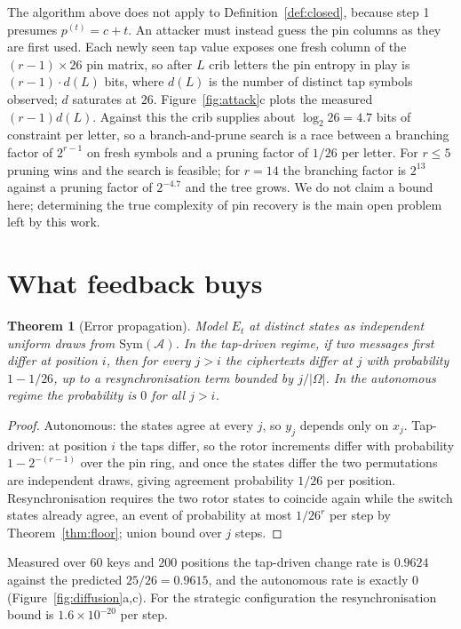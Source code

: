 \documentclass[11pt]{article}
\newtheorem{theorem}{Theorem}
\theoremstyle{definition}
\newcommand{\Sym}{\mathrm{Sym}}
\newcommand{\Om}{\Omega}
\begin{document}
The algorithm above does not apply to Definition~\ref{def:closed}, because step
1 presumes $p^{(t)} = c + t$. An attacker must instead guess the pin columns as
they are first used. Each newly seen tap value exposes one fresh column of the
$(r{-}1)\times 26$ pin matrix, so after $L$ crib letters the pin entropy in play
is $(r-1)\cdot d(L)$ bits, where $d(L)$ is the number of distinct tap symbols
observed; $d$ saturates at $26$. Figure~\ref{fig:attack}c plots the measured
$(r-1)d(L)$. Against this the crib supplies about $\log_2 26 = 4.7$ bits of
constraint per letter, so a branch-and-prune search is a race between a
branching factor of $2^{r-1}$ on fresh symbols and a pruning factor of $1/26$
per letter. For $r \le 5$ pruning wins and the search is feasible; for
$r = 14$ the branching factor is $2^{13}$ against a pruning factor of $2^{-4.7}$
and the tree grows. We do not claim a bound here; determining the true
complexity of pin recovery is the main open problem left by this work.

\section{What feedback buys}\label{sec:feedback}

\begin{theorem}[Error propagation]\label{thm:avalanche}
Model $E_t$ at distinct states as independent uniform draws from
$\Sym(\mathcal{A})$. In the tap-driven regime, if two messages first differ at
position $i$, then for every $j > i$ the ciphertexts differ at $j$ with
probability $1 - 1/26$, up to a resynchronisation term bounded by $j/|\Om|$. In
the autonomous regime the probability is $0$ for all $j > i$.
\end{theorem}

\begin{proof}
Autonomous: the states agree at every $j$, so $y_j$ depends only on $x_j$.
Tap-driven: at position $i$ the taps differ, so the rotor increments differ with
probability $1 - 2^{-(r-1)}$ over the pin ring, and once the states differ the
two permutations are independent draws, giving agreement probability $1/26$ per
position. Resynchronisation requires the two rotor states to coincide again
while the switch states already agree, an event of probability at most
$1/26^{r}$ per step by Theorem~\ref{thm:floor}; union bound over $j$ steps.
\end{proof}

Measured over $60$ keys and $200$ positions the tap-driven change rate is
$0.9624$ against the predicted $25/26 = 0.9615$, and the autonomous rate is
exactly $0$ (Figure~\ref{fig:diffusion}a,c). For the strategic configuration the
resynchronisation bound is $1.6\times10^{-20}$ per step.
\end{document}
